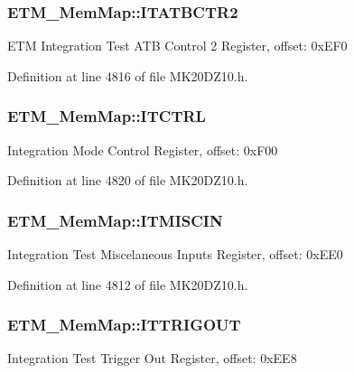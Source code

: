 \subsubsection[{\texorpdfstring{I\+T\+A\+T\+B\+C\+T\+R2}{ITATBCTR2}}]{ E\+T\+M\+\_\+\+Mem\+Map\+::\+I\+T\+A\+T\+B\+C\+T\+R2}\hypertarget{struct_e_t_m___mem_map_ac2904f8a9c14b9bc63b82fddb4595962}{}\label{struct_e_t_m___mem_map_ac2904f8a9c14b9bc63b82fddb4595962}
E\+TM Integration Test A\+TB Control 2 Register, offset\+: 0x\+E\+F0 

Definition at line 4816 of file M\+K20\+D\+Z10.\+h.

\subsubsection[{\texorpdfstring{I\+T\+C\+T\+RL}{ITCTRL}}]{ E\+T\+M\+\_\+\+Mem\+Map\+::\+I\+T\+C\+T\+RL}\hypertarget{struct_e_t_m___mem_map_a01935d66d22a870449dfbcae7f735fd8}{}\label{struct_e_t_m___mem_map_a01935d66d22a870449dfbcae7f735fd8}
Integration Mode Control Register, offset\+: 0x\+F00 

Definition at line 4820 of file M\+K20\+D\+Z10.\+h.

\subsubsection[{\texorpdfstring{I\+T\+M\+I\+S\+C\+IN}{ITMISCIN}}]{ E\+T\+M\+\_\+\+Mem\+Map\+::\+I\+T\+M\+I\+S\+C\+IN}\hypertarget{struct_e_t_m___mem_map_ab0288cb0941aa3a494bc261eef1144f7}{}\label{struct_e_t_m___mem_map_ab0288cb0941aa3a494bc261eef1144f7}
Integration Test Miscelaneous Inputs Register, offset\+: 0x\+E\+E0 

Definition at line 4812 of file M\+K20\+D\+Z10.\+h.

\subsubsection[{\texorpdfstring{I\+T\+T\+R\+I\+G\+O\+UT}{ITTRIGOUT}}]{ E\+T\+M\+\_\+\+Mem\+Map\+::\+I\+T\+T\+R\+I\+G\+O\+UT}\hypertarget{struct_e_t_m___mem_map_a85a29fa5f53cb199fd980f61593d4c45}{}\label{struct_e_t_m___mem_map_a85a29fa5f53cb199fd980f61593d4c45}
Integration Test Trigger Out Register, offset\+: 0x\+E\+E8 

